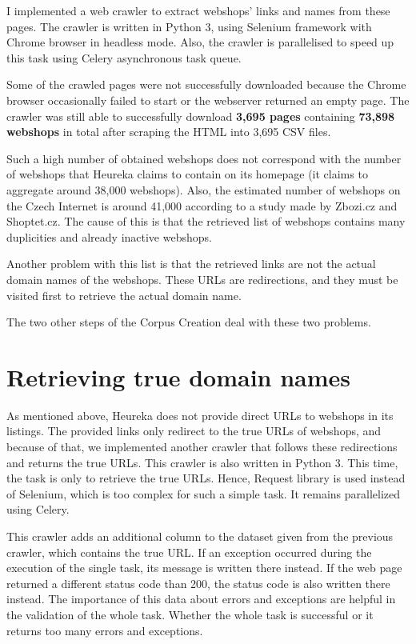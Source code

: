 I implemented a web crawler to extract webshops' links and names from these pages. The crawler is written in Python 3, using Selenium framework with Chrome browser in headless mode. Also, the crawler is parallelised to speed up this task using Celery asynchronous task queue. 

Some of the crawled pages were not successfully downloaded because the Chrome browser occasionally failed to start or the webserver returned an empty page. The crawler was still able to successfully download \textbf{3,695 pages} containing \textbf{73,898 webshops} in total after scraping the HTML into 3,695 CSV files.

Such a high number of obtained webshops does not correspond with the number of webshops that Heureka claims to contain on its homepage (it claims to aggregate around 38,000 webshops). Also, the estimated number of webshops on the Czech Internet is around 41,000 according to a study made by Zbozi.cz and Shoptet.cz\cite{srovnavace-shoptet}. The cause of this is that the retrieved list of webshops contains many duplicities and already inactive webshops.

Another problem with this list is that the retrieved links are not the actual domain names of the webshops. These URLs are redirections, and they must be visited first to retrieve the actual domain name.

The two other steps of the Corpus Creation deal with these two problems.

\section{Retrieving true domain names}

As mentioned above, Heureka does not provide direct URLs to webshops in its listings. The provided links only redirect to the true URLs of webshops, and because of that, we implemented another crawler that follows these redirections and returns the true URLs. This crawler is also written in Python 3. This time, the task is only to retrieve the true URLs. Hence, Request library is used instead of Selenium, which is too complex for such a simple task. It remains parallelized using Celery.

This crawler adds an additional column to the dataset given from the previous crawler, which contains the true URL. If an exception occurred during the execution of the single task, its message is written there instead. If the web page returned a different status code than 200, the status code is also written there instead. The importance of this data about errors and exceptions are helpful in the validation of the whole task. Whether the whole task is successful or it returns too many errors and exceptions.

